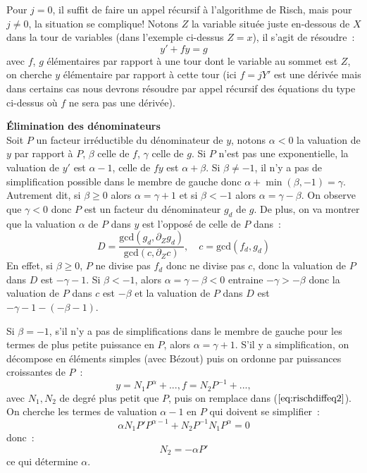 \documentclass[a4paper,11pt]{article}
\begin{document}
\begin{giacjshere}
Pour $j=0$, il suffit de faire un appel récursif à l'algorithme de Risch,
mais pour $j\neq 0$, la situation se complique!
Notons $Z$ la variable situ\'ee juste en-dessous de $X$ dans la tour
de variables (dans l'exemple ci-dessus $Z=x$), il s'agit de r\'esoudre~: 
\begin{equation} \label{eq:rischdiffeq2}
y'+f y=g
\end{equation}
avec $f$, $g$ \'el\'ementaires par rapport \`a une tour dont le
variable au sommet est $Z$, on cherche $y$ \'el\'ementaire par rapport
\`a cette tour (ici $f=jY'$ est une d\'eriv\'ee mais dans certains
cas nous devrons r\'esoudre par appel r\'ecursif des \'equations
du type ci-dessus o\`u $f$ ne sera pas une d\'eriv\'ee).

{\bf \'Elimination des d\'enominateurs}\\
Soit $P$ un facteur irréductible du d\'enominateur de $y$, notons 
$\alpha<0$ la valuation de $y$ par rapport \`a $P$, 
$\beta$ celle de $f$, $\gamma$ celle de $g$. 
Si $P$ n'est pas une exponentielle,
la valuation de $y'$ est $\alpha-1$, celle de $ f y $ est $\alpha +\beta $. 
Si $\beta \neq -1$, 
il n'y a pas de simplification possible dans le membre de gauche
donc $\alpha + \min(\beta,-1) =\gamma$. Autrement dit, si 
$\beta \geq 0$ alors $\alpha=\gamma+1$ et si $\beta<-1$ 
alors $\alpha=\gamma-\beta$.
On observe que $\gamma<0$ donc
$P$ est un facteur du d\'enominateur $g_d$ de $g$. De plus, on va montrer
que la valuation $\alpha$ de $P$ dans $y$ est l'oppos\'e de celle
de $P$ dans~:
\begin{equation} \label{eq:defD}
D=\frac{\mbox{gcd}(g_d,\partial_Z g_d)}{\mbox{gcd}(c,\partial_Z c)}, 
\quad c=\mbox{gcd}(f_d,g_d)
\end{equation}
En effet, si $\beta \geq 0$, $P$ ne divise pas $f_d$ donc ne divise
pas $c$, donc la valuation de $P$ dans $D$ est $-\gamma-1$. Si $\beta < -1$,
alors $\alpha=\gamma - \beta <0$ entraine $-\gamma > -\beta$ donc la
valuation de $P$ dans $c$ est $-\beta$ et la valuation de $P$ dans $D$
est $-\gamma-1 - (-\beta-1)$.

Si $\beta=-1$, s'il n'y a pas de simplifications dans le membre
de gauche pour les termes de plus petite puissance en $P$, alors 
$\alpha=\gamma+1$. S'il y a simplification,
on d\'ecompose en \'el\'ements
simples (avec B\'ezout) puis on ordonne par puissances croissantes
de $P$~:
\[y= N_1 P^\alpha +..., f= N_2 P^{-1}+...,\]
avec $N_1,N_2$ de degré plus petit que $P$, puis on remplace dans 
(\(\ref{eq:rischdiffeq2}\)). On cherche les termes de valuation $\alpha-1$
en $P$ qui doivent se simplifier~:
\[ \alpha N_1 P' P^{\alpha-1} + N_2 P^{-1} N_1 P^\alpha =0 \]
donc~:
\[ N_2 = -\alpha P' \]
ce qui d\'etermine $\alpha$.


\end{giacjshere}
\end{document}
